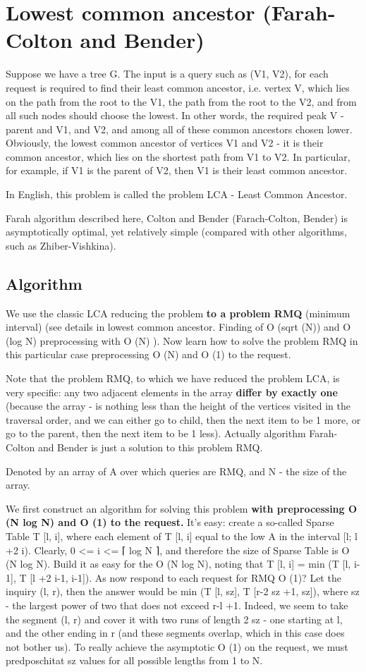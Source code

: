 \section{ Lowest common ancestor (Farah-Colton and Bender) }
Suppose we have a tree G. The input is a query such as (V1, V2), for each request is required to find their least common ancestor, i.e. vertex V, which lies on the path from the root to the V1, the path from the root to the V2, and from all such nodes should choose the lowest. In other words, the required peak V - parent and V1, and V2, and among all of these common ancestors chosen lower. Obviously, the lowest common ancestor of vertices V1 and V2 - it is their common ancestor, which lies on the shortest path from V1 to V2. In particular, for example, if V1 is the parent of V2, then V1 is their least common ancestor.

In English, this problem is called the problem LCA - Least Common Ancestor.

Farah algorithm described here, Colton and Bender (Farach-Colton, Bender) is asymptotically optimal, yet relatively simple (compared with other algorithms, such as Zhiber-Vishkina).

\subsection{ Algorithm }
We use the classic LCA reducing the problem \textbf{to a problem RMQ} (minimum interval) (see details in lowest common ancestor. Finding of O (sqrt (N)) and O (log N) preprocessing with O (N) ). Now learn how to solve the problem RMQ in this particular case preprocessing O (N) and O (1) to the request.

Note that the problem RMQ, to which we have reduced the problem LCA, is very specific: any two adjacent elements in the array \textbf{differ by exactly one} (because the array - is nothing less than the height of the vertices visited in the traversal order, and we can either go to child, then the next item to be 1 more, or go to the parent, then the next item to be 1 less). Actually algorithm Farah-Colton and Bender is just a solution to this problem RMQ.

Denoted by an array of A over which queries are RMQ, and N - the size of the array.

We first construct an algorithm for solving this problem \textbf{with preprocessing O (N log N) and O (1) to the request.} It's easy: create a so-called Sparse Table T [l, i], where each element of T [l, i] equal to the low A in the interval [l; l +2 i). Clearly, 0 <= i <= ⌈ log N ⌉, and therefore the size of Sparse Table is O (N log N). Build it as easy for the O (N log N), noting that T [l, i] = min (T [l, i-1], T [l +2 i-1, i-1]). As now respond to each request for RMQ O (1)? Let the inquiry (l, r), then the answer would be min (T [l, sz], T [r-2 sz +1, sz]), where sz - the largest power of two that does not exceed r-l +1. Indeed, we seem to take the segment (l, r) and cover it with two runs of length 2 sz - one starting at l, and the other ending in r (and these segments overlap, which in this case does not bother us). To really achieve the asymptotic O (1) on the request, we must predposchitat sz values ​​for all possible lengths from 1 to N.

